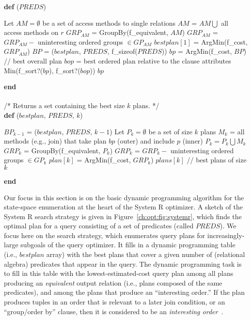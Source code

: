 \begin{figure*}
\ssp
\centering
\begin{boxedminipage}{\linewidth}
  {\bf def} ($PREDS$)
    \begin{algorithmic}[1]
	\STATE Let $AM = \emptyset$ be a set of access methods to single relations
		\STATE $AM$ = $AM \bigcup$ all access methods on $r$
  	\ENDFOR
	\STATE
	\STATE $GRP_{AM}$ = GroupBy(f\_equivalent, $AM$)
	\STATE $GRP_{AM}$ = $GRP_{AM} - $ uninteresting ordered groups $\in GP_{AM}$
	\STATE $bestplan[1]$ = ArgMin(f\_cost, $GRP_{AM}$)
	\STATE $BP$ = ($bestplan$, $PREDS$, f\_sizeof($PREDS$)) 
	\STATE $bp$ = ArgMin(f\_cost, $BP$) // best overall plan
	\STATE
		\STATE $bop$ = best ordered plan relative to the clause attributes
		\RETURN Min(f\_sort?($bp$), f\_sort?($bop$))
	\ELSE
	 	\RETURN $bp$
	\ENDIF
    \end{algorithmic}
  {\bf end}
  \\
  \\
  /* Returns a set containing the best size $k$ plans. */ \\
  {\bf def} ($bestplan$, $PREDS$, $k$)
    \begin{algorithmic}[1]
	\STATE $BP_{k-1}$ = ($bestplan$, $PREDS$, $k-1$)
	\STATE Let $P_{k} = \emptyset$ be a set of size $k$ plans
		\STATE $M_k$ = all methods (e.g., join) that take 
			       plan $bp$ (outer) and include $p$ (inner)
		\STATE $P_{k} = P_{k} \bigcup M_k$ 
		\ENDFOR
	\ENDFOR
	\STATE
	\STATE $GRP_{k}$ = GroupBy(f\_equivalent, $P_{k}$)
	\STATE $GRP_{k}$ = $GRP_{k} - $ uninteresting ordered groups $\in GP_{k}$
	\STATE $plan[k]$ = ArgMin(f\_cost, $GRP_{k}$)
	\ENDIF
	\RETURN $plans[k]$ // best plans of size $k$
      \end{algorithmic}
    {\bf end}
\end{boxedminipage}
\caption{\label{ch:opt:fig:systemr}Sketch of the System R optimizer algorithm.}
\end{figure*}

Our focus in this section is on the basic dynamic programming algorithm for the
state-space enumeration at the heart of the System R optimizer.  A sketch of
the System R search strategy is given in Figure~\ref{ch:opt:fig:systemr}, which
finds the optimal plan for a query consisting of a set of predicates (called
$PREDS$).  We focus here on the search strategy, which enumerates query plans for
increasingly-large subgoals of the query optimizer.  It fills in a dynamic
programming table (i.e., $bestplan$ array) with the best plans that cover a given
number of (relational algebra) predicates that appear in the query.  The
dynamic programming task is to fill in this table with the
lowest-estimated-cost query plan among all plans producing an {\em equivalent}
output relation (i.e., plans composed of the same predicates), and among the
plans that produce an ``interesting order.'' If the plan produces tuples in an
order that is relevant to a later join condition, or an ``group/order by''
clause, then it is considered to be an {\em interesting order}~\cite{selinger}.

